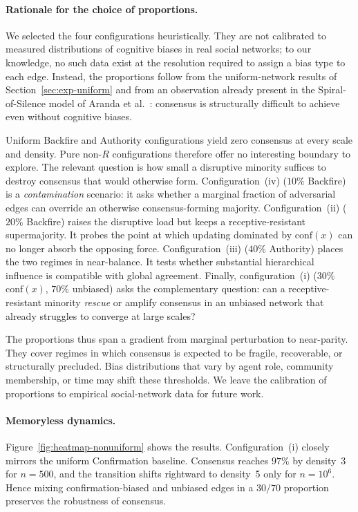 \paragraph{Rationale for the choice of proportions.}
We selected the four configurations heuristically. They are not
calibrated to measured distributions of cognitive biases in real social
networks; to our knowledge, no such data exist at the resolution
required to assign a bias type to each edge. Instead, the proportions
follow from the uniform-network results of Section~\ref{sec:exp-uniform}
and from an observation already present in the Spiral-of-Silence model
of Aranda et al.~\cite{aranda2024sound}: consensus is structurally
difficult to achieve even without cognitive biases.

Uniform Backfire and Authority configurations yield zero consensus at
every scale and density. Pure non-$R$ configurations therefore offer no
interesting boundary to explore. The relevant question is how small a
disruptive minority suffices to destroy consensus that would otherwise
form. Configuration~(iv) ($10\%$ Backfire) is a \emph{contamination}
scenario: it asks whether a marginal fraction of adversarial edges can
override an otherwise consensus-forming majority. Configuration~(ii)
($20\%$ Backfire) raises the disruptive load but keeps a
receptive-resistant supermajority. It probes the point at which updating
dominated by $\mathrm{conf}(x)$ can no longer absorb the opposing force.
Configuration~(iii) ($40\%$ Authority) places the two regimes in
near-balance. It tests whether substantial hierarchical influence is
compatible with global agreement. Finally, configuration~(i)
($30\%$ $\mathrm{conf}(x)$, $70\%$ unbiased) asks the complementary
question: can a receptive-resistant minority \emph{rescue} or amplify
consensus in an unbiased network that already struggles to converge at
large scales?

The proportions thus span a gradient from marginal perturbation to
near-parity. They cover regimes in which consensus is expected to be
fragile, recoverable, or structurally precluded. Bias distributions
that vary by agent role, community membership, or time may shift these
thresholds. We leave the calibration of proportions to empirical
social-network data for future work.

\paragraph{Memoryless dynamics.}
Figure~\ref{fig:heatmap-nonuniform} shows the results.
Configuration~(i) closely mirrors the uniform Confirmation baseline.
Consensus reaches $97\%$ by density~3 for $n=500$, and the transition
shifts rightward to density~5 only for $n=10^6$. Hence mixing
confirmation-biased and unbiased edges in a $30/70$ proportion
preserves the robustness of consensus.

